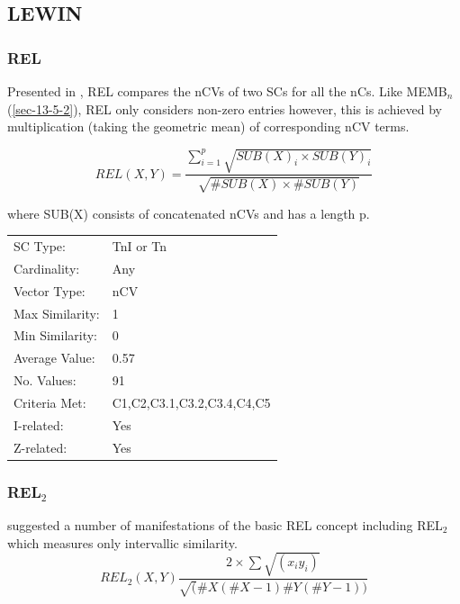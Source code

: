 \documentclass{article}
\begin{document}
\subsection{LEWIN}
\label{sec-13-7}
\subsubsection{REL}
\label{sec-13-7-1}

Presented in \citet{Lewin1979}, REL compares the nCVs of two SCs for
all the nCs. Like MEMB$_{n}$ (\ref{sec-13-5-2}), REL only considers non-zero
entries however, this is achieved by multiplication (taking the
geometric mean) of corresponding nCV terms.

$$REL(X,Y)=\frac{\sum_{i=1}^{p}{\sqrt{SUB(X)_{i}\times SUB(Y)_{i}}}}{\sqrt{\#SUB(X)\times \#SUB(Y)}}$$

where SUB(X) consists of concatenated nCVs and has a length p.

\begin{center}
\begin{tabular}{ll}
 SC Type:         &  TnI or Tn                   \\
 Cardinality:     &  Any                         \\
 Vector Type:     &  nCV                         \\
 Max Similarity:  &  1                           \\
 Min Similarity:  &  0                           \\
 Average Value:   &  0.57                        \\
 No. Values:      &  91                          \\
 Criteria Met:    &  C1,C2,C3.1,C3.2,C3.4,C4,C5  \\
 I-related:       &  Yes                         \\
 Z-related:       &  Yes                         \\
\end{tabular}
\end{center}
\subsubsection{REL$_{2}$}
\label{sec-13-7-2}

\citet{Rahn1979} suggested a number of manifestations of the basic REL
concept including REL$_{2}$ which measures only intervallic similarity.
$$ REL_{2}(X,Y)\frac{2\times\sum\sqrt{(x_{i}y_{i})}}{\sqrt(\#X(\#X-1)\#Y(\#Y-1))} $$
\end{document}
